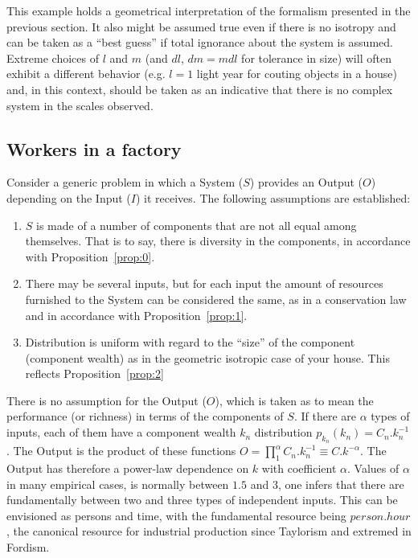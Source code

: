 \documentclass[a4paper, 11pt]{article} %
\begin{document}
This example holds a geometrical
interpretation of the formalism presented in the previous section.
It also might be assumed true even if there is no isotropy
and can be taken as a ``best guess'' if total ignorance
about the system is assumed. 
Extreme choices of $l$ and $m$ (and $dl$, $dm=mdl$ for tolerance in size)
will often exhibit a different behavior (e.g. $l=1$ light year for couting objects in a house) and, in this context, should be taken as an indicative that there is no complex system in the scales observed. 

\subsection{Workers in a factory}
Consider a generic problem in which a System ($S$) provides an Output ($O$) depending on the Input ($I$) it receives.
The following assumptions are established:
\begin{enumerate}
	\item $S$ is made of a number of components that are not all equal among themselves.
That is to say, there is diversity in the components, in accordance with Proposition~\ref{prop:0}. 
\item There may be several inputs, but for each input the amount of resources furnished to the System can be considered the same,
as in a conservation law and in accordance with Proposition~\ref{prop:1}.
\item Distribution is uniform with regard to the ``size'' of the component (component wealth) as in the geometric isotropic case of your house.
This reflects Proposition~\ref{prop:2}
\end{enumerate}

There is no assumption for the Output ($O$), which is taken as to mean the performance (or richness) in terms of the components of $S$.
If there are $\alpha$ types of inputs,
each of them have a component wealth $k_n$ distribution
$p_{k_n}(k_n)=C_n.k_n^{-1}$.
The Output is the product of these functions
$O = \prod_1^{\alpha} C_n.k_n^{-1}\equiv C.k^{-\alpha}$. 
The Output has therefore a power-law dependence on $k$ with coefficient $\alpha$. 
Values of $\alpha$ in many empirical cases,
is normally between $1.5$ and $3$,
one infers that there are 
fundamentally between two and three types
of independent inputs.
This can be envisioned as persons and 
time, with the fundamental resource being 
$person . hour$, the canonical resource for 
industrial production since Taylorism
and extremed in Fordism.
\end{document}
